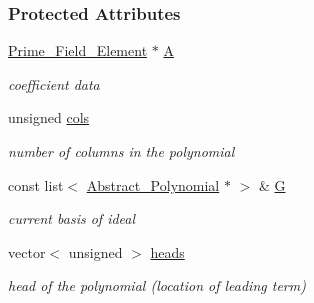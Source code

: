 \subsubsection*{Protected Attributes}
\begin{DoxyCompactItemize}
\item 
\mbox{\label{group___g_b_computation_a98a30cca19738d3f46d41b0348d5ff58}} 
\hyperlink{group___fields_group_class_prime___field___element}{Prime\+\_\+\+Field\+\_\+\+Element} $\ast$ \hyperlink{group___g_b_computation_a98a30cca19738d3f46d41b0348d5ff58}{A}
\begin{DoxyCompactList}\small\item\em coefficient data \end{DoxyCompactList}\item 
\mbox{\label{group___g_b_computation_ad6d430e1b9a27198ea4acf53c632b9b4}} 
unsigned \hyperlink{group___g_b_computation_ad6d430e1b9a27198ea4acf53c632b9b4}{cols}
\begin{DoxyCompactList}\small\item\em number of columns in the polynomial \end{DoxyCompactList}\item 
\mbox{\label{group___g_b_computation_a3dbc8c690c4a21ba195ae32c19982f79}} 
const list$<$ \hyperlink{group__polygroup_class_abstract___polynomial}{Abstract\+\_\+\+Polynomial} $\ast$ $>$ \& \hyperlink{group___g_b_computation_a3dbc8c690c4a21ba195ae32c19982f79}{G}
\begin{DoxyCompactList}\small\item\em current basis of ideal \end{DoxyCompactList}\item 
\mbox{\label{group___g_b_computation_ae5e8393488f6c58e3a5ca2a7c622f854}} 
vector$<$ unsigned $>$ \hyperlink{group___g_b_computation_ae5e8393488f6c58e3a5ca2a7c622f854}{heads}
\begin{DoxyCompactList}\small\item\em head of the polynomial (location of leading term) \end{DoxyCompactList}\item 
\mbox{\label{group___g_b_computation_a7dac72addf3ef8ff2c87c247a90eaa9d}} 

\end{DoxyCompactItemize}
